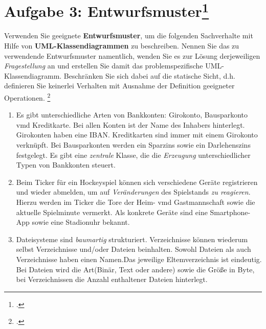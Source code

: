 \documentclass{lehramt-informatik-minimal}
\begin{document}
\section{Aufgabe 3: Entwurfsmuster\footcite{sosy:pu:4}}

Verwenden Sie geeignete \textbf{Entwurfsmuster}, um die folgenden
Sachverhalte mit Hilfe von \textbf{UML-Klassendiagrammen} zu
beschreiben. Nennen Sie das zu verwendende Entwurfsmuster namentlich,
wenden Sie es zur Lösung derjeweiligen \emph{Fragestellung} an und
erstellen Sie damit das problemspezifische UML-Klassendiagramm.
Beschränken Sie sich dabei auf die statische Sicht, d.h. definieren Sie
keinerlei Verhalten mit Ausnahme der Definition geeigneter Operationen.
\footcite[Seite 11]{examen:46116:2017:09}

\begin{enumerate}
\item Es gibt unterschiedliche Arten von Bankkonten: Girokonto,
Bausparkonto vmd Kreditkarte. Bei allen Konten ist der Name des Inhabers
hinterlegt. Girokonten haben eine IBAN. Kreditkarten sind immer mit
einem Girokonto verknüpft. Bei Bausparkonten werden ein Sparzins sowie
ein Darlehenszins festgelegt. Es gibt eine \emph{zentrale} Klasse, die
die \emph{Erzeugung} unterschiedlicher Typen von Bankkonten steuert.

\item Beim Ticker für ein Hockeyspiel können sich verschiedene Geräte
registrieren und wieder abmelden, um auf \emph{Veränderungen} des
Spielstands \emph{zu reagieren}. Hierzu werden im Ticker die Tore der
Heim- vmd Gastmannschaft sowie die aktuelle Spielminute vermerkt. Als
konkrete Geräte sind eine Smartphone-App sowie eine Stadionuhr bekannt.

\item Dateisysteme sind \emph{baumartig} strukturiert. Verzeichnisse
können wiederum selbst Verzeichnisse und/oder Dateien beinhalten. Sowohl
Dateien als auch Verzeichnisse haben einen Namen.Das jeweilige
Eltemverzeichnis ist eindeutig. Bei Dateien wird die Art(Binär, Text
oder andere) sowie die Größe in Byte, bei Verzeichnissen die Anzahl
enthaltener Dateien hinterlegt.
\end{enumerate}
\end{document}
